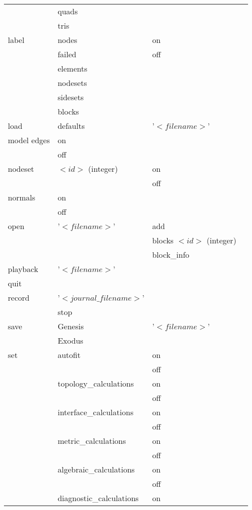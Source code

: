 \documentclass[10pt]{report}
\begin{document}
\begin{appendix}
\begin{center}
\begin{longtable}{|l|l|l|l|}
   & quads & & \\
   & tris & & \\
\hline
label & nodes    & on  & \\
      & failed   & off & \\
      & elements &     & \\
      & nodesets &     & \\
      & sidesets &     & \\
      & blocks   &     & \\
\hline
load &  defaults &  '$<filename>$' & \\
\hline
model edges & on  & & \\
            & off & & \\
\hline
nodeset & $<id>$ (integer) & on & \\ %
        &                  & off & \\ 
\hline
normals & on  & & \\ %
        & off & & \\ 
\hline
open & '$<filename>$' & add & \\
     &                & blocks $<id>$ (integer) & \\
     &                & block\_info  & \\
\hline
playback &  '$<filename>$' & & \\
\hline
quit & & & \\
\hline
record & '$<journal\_filename>$' & & \\
 & stop & & \\
\hline
save & Genesis & '$<filename>$' & \\
     & Exodus  & \\
\hline
set & autofit & on  & \\
    &         & off & \\
\cline{2-4}
& topology\_calculations & on & \\
    &                       & off & \\
\cline{2-4}
 &  interface\_calculations  & on & \\
 &                          & off & \\
\cline{2-4}
 & metric\_calculations      & on & \\
 &                          & off & \\
\cline{2-4}
 & algebraic\_calculations   & on & \\
 &                          & off & \\
\cline{2-4}
 & diagnostic\_calculations  & on & \\

\end{longtable}
\end{center}
\end{appendix}
\end{document}
